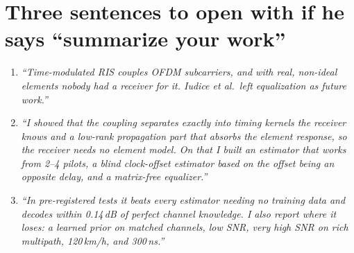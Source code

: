 \documentclass[11pt,a4paper]{article}
\begin{document}
\section{Three sentences to open with if he says ``summarize your work''}
\begin{keybox}
\begin{enumerate}
\item \emph{``Time-modulated RIS couples OFDM subcarriers, and with real, non-ideal elements nobody had a receiver for it.
Iudice et al.\ left equalization as future work.''}
\item \emph{``I showed that the coupling separates exactly into timing kernels the receiver knows and a low-rank propagation
part that absorbs the element response, so the receiver needs no element model. On that I built an estimator that works
from 2--4 pilots, a blind clock-offset estimator based on the offset being an opposite delay, and a matrix-free
equalizer.''}
\item \emph{``In pre-registered tests it beats every estimator needing no training data and decodes within 0.14\,dB of
perfect channel knowledge. I also report where it loses: a learned prior on matched channels, low SNR, very high SNR on rich
multipath, 120\,km/h, and 300\,ns.''}
\end{enumerate}
\end{keybox}
\end{document}
